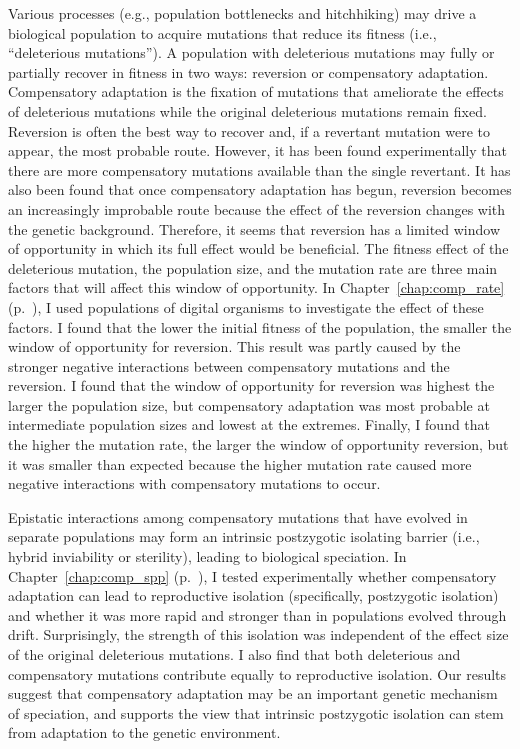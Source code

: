 \begin{doublespace}
Various processes (e.g., population bottlenecks and hitchhiking)
may drive a biological population to acquire mutations
that reduce its fitness (i.e., ``deleterious mutations'').
%
A population with deleterious mutations may fully or partially recover
in fitness in two ways: reversion or compensatory adaptation.
%
Compensatory adaptation is the fixation of mutations
that ameliorate the effects of deleterious mutations
while the original deleterious mutations remain fixed.
%
Reversion is often the best way to recover and,
if a revertant mutation were to appear, the most probable route.
%
However, it has been found experimentally that
there are more compensatory mutations available
than the single revertant.
%
It has also been found that once compensatory adaptation
has begun, reversion becomes an increasingly improbable route
because the effect of the reversion changes with the genetic background.
%
Therefore, it seems that reversion has a limited
window of opportunity in which its full effect would be beneficial.
%
The fitness effect of the deleterious mutation,
the population size, and the mutation rate are three main factors
that will affect this window of opportunity.
%
In Chapter~\ref{chap:comp_rate} (p.~\pageref{chap:comp_rate}),
I used populations of digital organisms
to investigate the effect of these factors.
%
I found that the lower the initial fitness of the population,
the smaller the window of opportunity for reversion.
%
This result was partly caused by the stronger negative interactions
between compensatory mutations and the reversion.
%
I found that the window of opportunity for reversion
was highest the larger the population size,
but compensatory adaptation was most probable
at intermediate population sizes and lowest at the extremes.
%
Finally, I found that the higher the mutation rate,
the larger the window of opportunity reversion,
but it was smaller than expected because
the higher mutation rate caused more negative interactions
with compensatory mutations to occur.



Epistatic interactions among compensatory mutations that have
evolved in separate populations may form an intrinsic
postzygotic isolating barrier (i.e., hybrid inviability or sterility),
leading to biological speciation.
%
In Chapter~\ref{chap:comp_spp} (p.~\pageref{chap:comp_spp}),
I tested experimentally whether compensatory adaptation
can lead to reproductive isolation (specifically, postzygotic isolation)
and whether it was more rapid and stronger
than in populations evolved through drift.
%
Surprisingly, the strength of this isolation was independent
of the effect size of the original deleterious mutations.
%
I also find that
both deleterious and compensatory mutations
contribute equally to reproductive isolation.
%
Our results suggest that compensatory adaptation may be
an important genetic mechanism of speciation,
and supports the view that intrinsic postzygotic isolation
can stem from adaptation to the genetic environment.




\end{doublespace}
